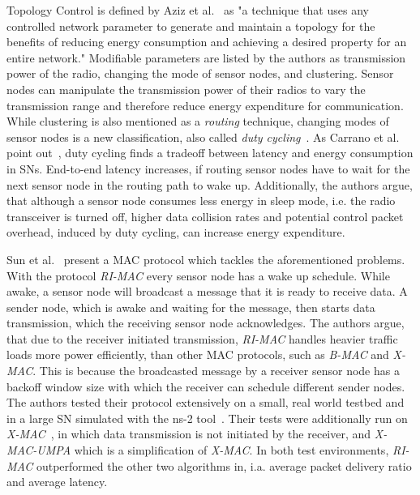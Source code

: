 Topology Control is defined by Aziz et al.~\cite{aziz2013survey} as "a
technique that uses any controlled network parameter to generate and maintain a
topology for the benefits of reducing energy consumption and achieving a
desired property for an entire network." Modifiable parameters are listed by
the authors as transmission power of the radio, changing the mode of sensor
nodes, and clustering. Sensor nodes can manipulate the transmission power of
their radios to vary the transmission range and therefore reduce energy
expenditure for communication. While clustering is also mentioned as a
\textit{routing} technique, changing modes of sensor nodes is a new
classification, also called \textit{duty cycling}~\cite{carrano2014survey,
lin2004medium, buettner2006x}. As Carrano et al. point
out~\cite{carrano2014survey}, duty cycling finds a tradeoff between latency and
energy consumption in \acp{SN}. End-to-end latency increases, if routing sensor
nodes have to wait for the next sensor node in the routing path to wake up.
Additionally, the authors argue, that although a sensor node consumes less
energy in sleep mode, i.e. the radio transceiver is turned off, higher data
collision rates and potential control packet overhead, induced by duty cycling,
can increase energy expenditure.

Sun et al.~\cite{sun2008ri} present a \ac{MAC} protocol which tackles the
aforementioned problems. With the protocol \textit{RI-MAC} every sensor node
has a wake up schedule. While awake, a sensor node will broadcast a message
that it is ready to receive data. A sender node, which is awake and waiting for
the message, then starts data transmission, which the receiving sensor node
acknowledges. The authors argue, that due to the receiver initiated
transmission, \textit{RI-MAC} handles heavier traffic loads more power
efficiently, than other \ac{MAC} protocols, such as \textit{B-MAC} and
\textit{X-MAC}. This is because the broadcasted message by a receiver sensor
node has a backoff window size with which the receiver can schedule different
sender nodes. The authors tested their protocol extensively on a small, real
world testbed and in a large \ac{SN} simulated with the ns-2
tool~\cite{bajaj1999improving}. Their tests were additionally run on
\textit{X-MAC}~\cite{buettner2006x}, in which data transmission is not
initiated by the receiver, and \textit{X-MAC-UMPA} which is a simplification of
\textit{X-MAC}. In both test environments, \textit{RI-MAC} outperformed the
other two algorithms in, i.a. average packet delivery ratio and average
latency.

